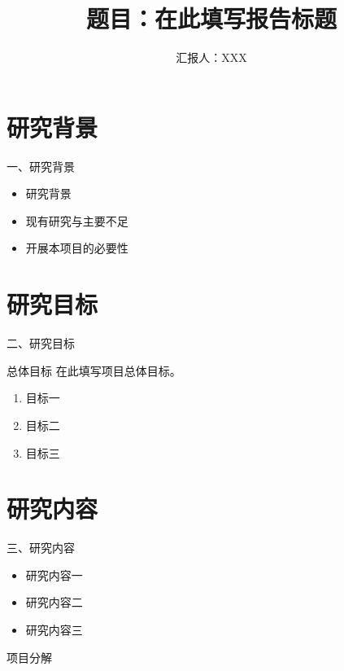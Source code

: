 \documentclass[10pt,aspectratio=169]{beamer}
\title[报告简称]{题目：在此填写报告标题}
\subtitle{}
\author{汇报人：XXX}
\institute{XXX研究部}
\date{\PCLtoday}
\begin{document}
\maketitle
\PCLcontents

\section{研究背景}
\begin{frame}{一、研究背景}
  \vspace{0.5cm}
  \begin{itemize}
    \setlength{\itemsep}{0.7em}
    \item 研究背景
    \item 现有研究与主要不足
    \item 开展本项目的必要性
  \end{itemize}
\end{frame}

\section{研究目标}
\begin{frame}{二、研究目标}
  \begin{block}{总体目标}
    在此填写项目总体目标。
  \end{block}
  \begin{enumerate}
    \setlength{\itemsep}{0.7em}
    \item 目标一
    \item 目标二
    \item 目标三
  \end{enumerate}
\end{frame}

\section{研究内容}
\begin{frame}{三、研究内容}
  \begin{itemize}
    \setlength{\itemsep}{0.8em}
    \item 研究内容一
    \item 研究内容二
    \item 研究内容三
  \end{itemize}
\end{frame}

\begin{frame}{项目分解}
  \centering
\end{frame}
\end{document}
